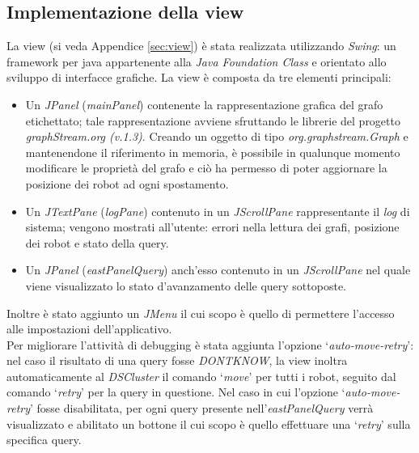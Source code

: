 \subsection{Implementazione della view}
\label{sec:viewImpl}
La view (si veda Appendice \ref{sec:view}) è stata realizzata utilizzando \emph{Swing}:
un framework per java appartenente
alla \emph{Java Foundation Class} e orientato allo sviluppo di interfacce grafiche.
La view è composta da tre elementi principali:
\begin{itemize}
	\item Un \emph{JPanel} (\emph{mainPanel}) contenente la rappresentazione
	grafica del grafo etichettato; tale rappresentazione avviene sfruttando le librerie del progetto \emph{graphStream.org (v.1.3)}. Creando un oggetto di tipo \emph{org.graphstream.Graph} e mantenendone il riferimento in memoria, è possibile in qualunque momento modificare le proprietà
	del grafo e ciò ha permesso di poter aggiornare la posizione dei robot ad ogni spostamento.
	\item Un \emph{JTextPane} (\emph{logPane}) contenuto in un \emph{JScrollPane} rappresentante il \emph{log} di sistema; vengono mostrati all'utente: errori nella lettura dei grafi, posizione dei robot e stato della query.
	\item Un \emph{JPanel} (\emph{eastPanelQuery}) anch'esso contenuto in un \emph{JScrollPane} nel quale viene visualizzato lo stato d'avanzamento delle query sottoposte.
\end{itemize}
Inoltre è stato aggiunto un \emph{JMenu} il cui scopo è quello di permettere l'accesso alle impostazioni dell'applicativo.\\

Per migliorare l'attività di debugging è stata aggiunta l'opzione `\emph{auto-move-retry}': nel caso il
risultato di una query fosse \emph{DONTKNOW}, la view inoltra automaticamente al \emph{DSCluster} il comando `\emph{move}' per tutti i robot, seguito dal comando `\emph{retry}'
per la query in questione.
Nel caso in cui l'opzione `\emph{auto-move-retry}' fosse disabilitata, per ogni query presente nell'\emph{eastPanelQuery} verrà visualizzato e abilitato un bottone il cui scopo è quello effettuare
una `\emph{retry}' sulla specifica query.
